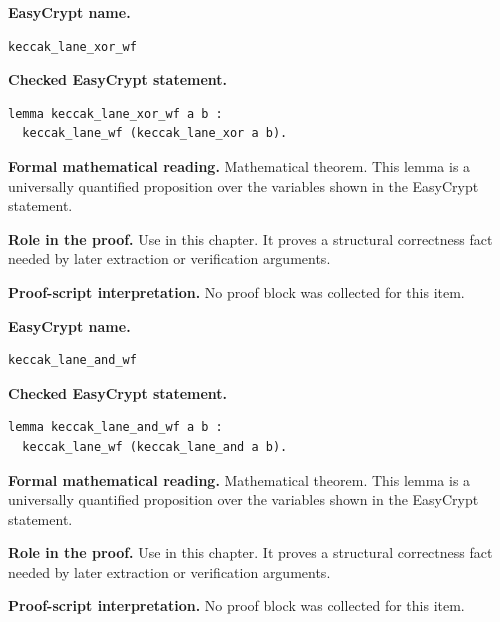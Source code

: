 \begin{formaltheorem}
\noindent\textbf{EasyCrypt name.}
\begin{lstlisting}[language=EasyCrypt,basicstyle=\ttfamily\scriptsize]
keccak_lane_xor_wf
\end{lstlisting}
\noindent\textbf{Checked EasyCrypt statement.}
\begin{lstlisting}[language=EasyCrypt,basicstyle=\ttfamily\scriptsize]
lemma keccak_lane_xor_wf a b :
  keccak_lane_wf (keccak_lane_xor a b).
\end{lstlisting}
\noindent\textbf{Formal mathematical reading.}
Mathematical theorem. This lemma is a universally quantified proposition over the variables shown in the EasyCrypt statement.

\noindent\textbf{Role in the proof.}
Use in this chapter. It proves a structural correctness fact needed by later extraction or verification arguments.

\noindent\textbf{Proof-script interpretation.}
No proof block was collected for this item.

\end{formaltheorem}

\begin{formaltheorem}
\noindent\textbf{EasyCrypt name.}
\begin{lstlisting}[language=EasyCrypt,basicstyle=\ttfamily\scriptsize]
keccak_lane_and_wf
\end{lstlisting}
\noindent\textbf{Checked EasyCrypt statement.}
\begin{lstlisting}[language=EasyCrypt,basicstyle=\ttfamily\scriptsize]
lemma keccak_lane_and_wf a b :
  keccak_lane_wf (keccak_lane_and a b).
\end{lstlisting}
\noindent\textbf{Formal mathematical reading.}
Mathematical theorem. This lemma is a universally quantified proposition over the variables shown in the EasyCrypt statement.

\noindent\textbf{Role in the proof.}
Use in this chapter. It proves a structural correctness fact needed by later extraction or verification arguments.

\noindent\textbf{Proof-script interpretation.}
No proof block was collected for this item.

\end{formaltheorem}

